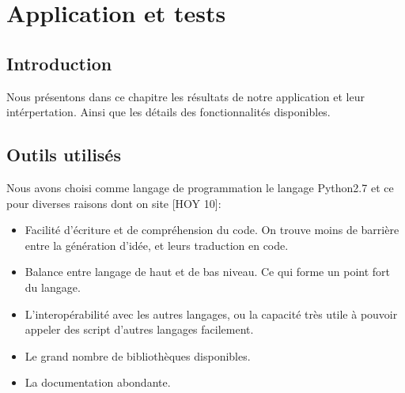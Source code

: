 
\chapter{Application et tests} %

\label{Chapter3} %





\section{Introduction}

Nous présentons dans ce  chapitre les résultats de notre application et leur intérpertation. Ainsi que les détails des fonctionnalités disponibles.

\section{Outils utilisés}

\indent Nous avons choisi comme langage de programmation le langage Python2.7 et ce pour diverses raisons dont on site [HOY 10]:\\

\begin{itemize}
\item Facilité d’écriture et de compréhension du code. On trouve moins de barrière entre la génération d'idée, et leurs traduction en code.
\item Balance entre langage de haut et de bas niveau. Ce qui forme un point fort du langage.
\item L'interopérabilité avec les autres langages, ou la capacité très utile à pouvoir appeler des script d'autres langages facilement.
\item Le grand nombre de bibliothèques disponibles.
\item La documentation abondante.\\
\end{itemize}

